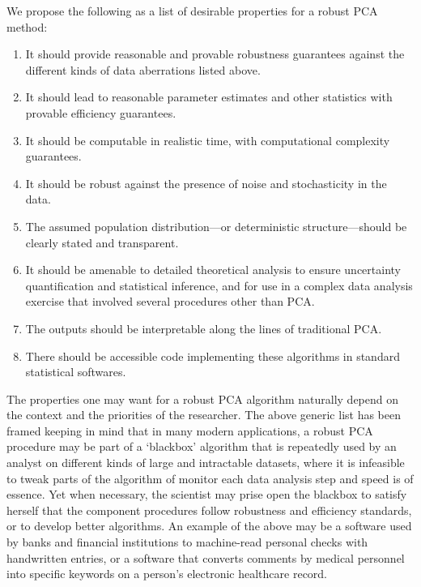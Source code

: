 \documentclass[ss]{imsart}
\theoremstyle{Example}
\begin{document}
We propose the following as a list of desirable properties for a robust PCA method:
%
\begin{enumerate}[label=\alph*),leftmargin=*]
\setlength\itemsep{0em}
    \item It should provide reasonable and provable robustness guarantees against the different kinds of data aberrations listed above.
    \item It should lead to reasonable parameter estimates and other statistics with provable efficiency guarantees.
    \item It should be computable in realistic time, with computational complexity guarantees.
    \item It should be robust against the presence of noise and stochasticity in the data.
    \item The assumed population distribution---or deterministic structure---should be clearly stated and transparent.
    \item It should be amenable to detailed theoretical analysis to ensure uncertainty quantification and statistical inference,  and for use in a complex data analysis exercise that involved several procedures other than PCA.
    \item The outputs should be interpretable along the lines of traditional PCA.
    \item There should be accessible code implementing these algorithms in standard statistical softwares.
\end{enumerate}

The properties one may want for a robust PCA algorithm naturally depend on the context and the priorities of the researcher. The above generic list has been framed keeping in mind that in many modern applications, a robust PCA procedure may be part of a `blackbox' algorithm that is repeatedly used by an analyst on different kinds of large and intractable datasets, where it is infeasible to tweak parts of the algorithm of monitor each data analysis step and speed is of essence. Yet when necessary,  the scientist may prise open the blackbox to satisfy herself that the component procedures follow robustness and efficiency standards, or to develop better algorithms. An example of the above may be a software used by banks and financial institutions to machine-read personal checks with handwritten entries, or a software that converts comments by medical personnel into specific keywords on a person's electronic healthcare record. 
\end{document}
